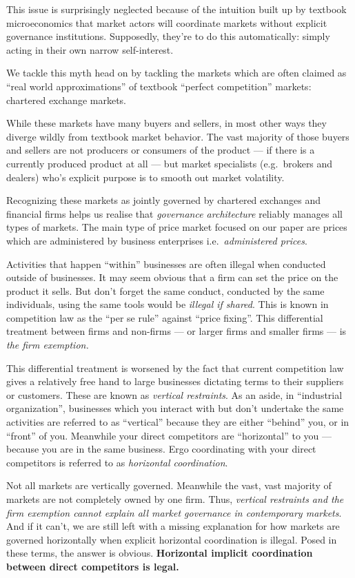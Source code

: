 \documentclass[
]{book}
\begin{document}
This issue is surprisingly neglected because of the intuition built up by textbook microeconomics that market actors will coordinate markets without explicit governance institutions. Supposedly, they're to do this automatically: simply acting in their own narrow self-interest.

We tackle this myth head on by tackling the markets which are often claimed as ``real world approximations'' of textbook ``perfect competition'' markets: chartered exchange markets.

While these markets have many buyers and sellers, in most other ways they diverge wildly from textbook market behavior. The vast majority of those buyers and sellers are not producers or consumers of the product --- if there is a currently produced product at all --- but market specialists (e.g.~brokers and dealers) who's explicit purpose is to smooth out market volatility.

Recognizing these markets as jointly governed by chartered exchanges and financial firms helps us realise that \emph{governance architecture} reliably manages all types of markets.
The main type of price market focused on our paper are prices which are administered by business enterprises i.e.~\emph{administered prices}.

Activities that happen ``within'' businesses are often illegal when conducted outside of businesses. It may seem obvious that a firm can set the price on the product it sells. But don't forget the same conduct, conducted by the same individuals, using the same tools would be \emph{illegal if shared}.
This is known in competition law as the ``per se rule'' against ``price fixing''.
This differential treatment between firms and non-firms --- or larger firms and smaller firms --- is \emph{the firm exemption.}

This differential treatment is worsened by the fact that current competition law gives a relatively free hand to large businesses dictating terms to their suppliers or customers. These are known as \emph{vertical restraints}. As an aside, in ``industrial organization'', businesses which you interact with but don't undertake the same activities are referred to as ``vertical'' because they are either ``behind'' you, or in ``front'' of you. Meanwhile your direct competitors are ``horizontal'' to you --- because you are in the same business. Ergo coordinating with your direct competitors is referred to as \emph{horizontal coordination}.

Not all markets are vertically governed. Meanwhile the vast, vast majority of markets are not completely owned by one firm. Thus, \emph{vertical restraints and the firm exemption cannot explain all market governance in contemporary markets}. And if it can't, we are still left with a missing explanation for how markets are governed horizontally when explicit horizontal coordination is illegal. Posed in these terms, the answer is obvious. \textbf{Horizontal implicit coordination between direct competitors is legal.}
\end{document}

